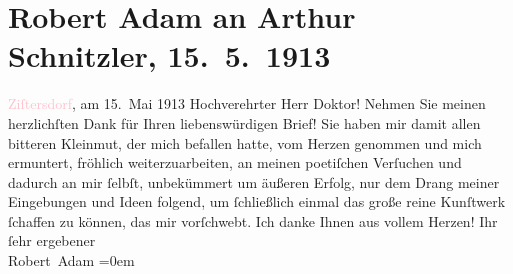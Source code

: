 

               \section[Robert Adam an Arthur Schnitzler, 15. 5. 1913]{ Robert Adam an Arthur Schnitzler, 15. 5. 1913}\nopagebreak{}\rehead{ }\normalsize\beginnumbering{} \toendnotes[C]{\smallbreak\pagebreak[2]} 
\pstart
           \raggedleft{}{\pb}\textcolor{pink}{Ziſtersdorf}{}\ledrightnote{\textcolor{pink}{Zistersdorf}}, am 15. Mai 1913\pend
           \pstart{}Hochverehrter Herr Doktor!\pend\pstart
           Nehmen Sie meinen herzlichſten Dank für Ihren liebenswürdigen Brief!\pend
           \pstart
           Sie haben mir damit allen bitteren Kleinmut, der mich befallen hatte, vom Herzen
                    genommen und mich ermuntert, fröhlich weiterzuarbeiten, an meinen poetiſchen
                        Ver{\pb}ſuchen und dadurch an mir ſelbſt,
                    unbekümmert um äußeren Erfolg, nur dem Drang meiner Eingebungen und Ideen
                    folgend, um ſchließlich einmal das große reine Kunſtwerk ſchaffen zu können, das
                    mir vorſchwebt.\pend
           \pstart
           Ich danke Ihnen aus vollem Herzen!\pend
           \pstart
           Ihr ſehr ergebener{\\[\baselineskip]}\spacefill\mbox{Robert Adam}\pend
           \leftskip=0em{}\endnumbering{}  
      